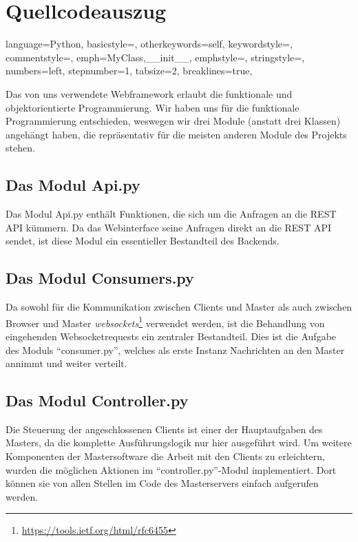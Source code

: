 \section{Quellcodeauszug}


\lstset
{
    language=Python,
    basicstyle=\footnotesize,
    otherkeywords={self},             %
    keywordstyle=\color{deepblue},
    commentstyle=\color{string-color},
    emph={MyClass,__init__},          %
    emphstyle=\color{deepred},    %
    stringstyle=\color{deepgreen},
    numbers=left,
    stepnumber=1,
    tabsize=2,
    breaklines=true,
}

Das von uns verwendete Webframework erlaubt die funktionale und objektorientierte Programmierung. Wir haben uns für die funktionale Programmierung
entschieden, weswegen wir drei Module (anstatt drei Klassen) angehängt haben, die repräsentativ für die meisten
anderen Module des Projekts stehen.

\subsection{Das Modul Api.py}
Das Modul Api.py enthält Funktionen, die sich um die Anfragen an die REST API kümmern.
Da das Webinterface seine Anfragen direkt an die REST API sendet, ist diese Modul ein essentieller
Bestandteil des Backends.


\subsection{Das Modul Consumers.py}
Da sowohl für die Kommunikation zwischen Clients und Master als auch zwischen Browser und
Master \textit{websockets}\footnote{\url{https://tools.ietf.org/html/rfc6455}} verwendet werden,
ist die Behandlung von eingehenden Websocketrequests ein zentraler Bestandteil. Dies ist die
Aufgabe des Moduls "`consumer.py"', welches als erste Instanz Nachrichten an den Master annimmt und
weiter verteilt.



\subsection{Das Modul Controller.py}
Die Steuerung der angeschlossenen Clients ist einer der Hauptaufgaben des Masters, da die komplette
Ausführungslogik nur hier ausgeführt wird. Um weitere Komponenten der Mastersoftware die Arbeit mit den
Clients zu erleichtern, wurden die möglichen Aktionen im "`controller.py"'-Modul implementiert. Dort können
sie von allen Stellen im Code des Masterservers einfach aufgerufen werden.


